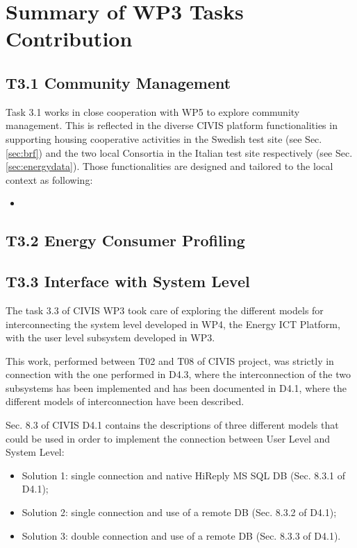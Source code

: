 \section{Summary of WP3 Tasks Contribution}

\subsection{T3.1 Community Management}

Task 3.1 works in close cooperation with WP5 to explore community management. This is reflected in the diverse CIVIS platform functionalities in supporting housing cooperative activities in the Swedish test site (see Sec. \ref{sec:brf}) and the two local Consortia in the Italian test site respectively (see Sec. \ref{sec:energydata}). Those functionalities are designed and tailored to the local context as following:   

\begin{itemize}
\item 
\end{itemize}

\subsection{T3.2 Energy Consumer Profiling}

\subsection{T3.3 Interface with System Level}

The task 3.3 of CIVIS WP3 took care of exploring the different models for interconnecting the system level developed in WP4, the Energy ICT Platform, with the user level subsystem developed in WP3.

This work, performed between T02 and T08 of CIVIS project, was strictly in connection with the one performed in D4.3, where the interconnection of the two subsystems has been implemented and has been documented in D4.1, where the different models of interconnection have been described.

Sec. 8.3 of CIVIS D4.1 contains the descriptions of three different models that could be used in order to implement the connection between User Level and System Level:

\begin{itemize}
\item Solution 1: single connection and native HiReply MS SQL DB (Sec. 8.3.1 of D4.1);
\item Solution 2: single connection and use of a remote DB (Sec. 8.3.2 of D4.1);
\item Solution 3: double connection and use of a remote DB (Sec. 8.3.3 of D4.1).
\end{itemize}


